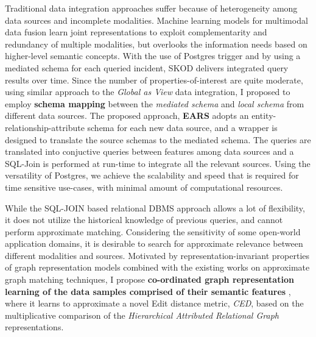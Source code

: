 
Traditional data integration approaches suffer because of heterogeneity among data sources and incomplete modalities. Machine learning models for multimodal data fusion learn joint representations to exploit complementarity and redundancy of multiple modalities, but overlooks the information needs based on higher-level semantic concepts. With the use of Postgres trigger and by using a mediated schema for each queried incident, SKOD delivers integrated query results over time. Since the number of properties-of-interest are quite moderate, using similar approach to the \textit{Global as View} data integration, I proposed to employ \textbf{schema mapping} between the \textit{mediated schema} and \textit{local schema} from different data sources. The proposed approach, \textbf{EARS} \cite{solaiman2021applying} adopts an entity-relationship-attribute schema for each new data source, and a wrapper is designed to translate the source schemas to the mediated schema. The queries are translated into conjuctive queries between features among data sources and a SQL-Join is performed at run-time to integrate all the relevant sources. Using the versatility of Postgres, we achieve the scalability and speed that is required for time sensitive use-cases, with minimal amount of computational resources. 

While the SQL-JOIN based relational DBMS approach allows a lot of flexibility, it does not utilize the historical knowledge of previous queries,
and cannot perform approximate matching. Considering the sensitivity of some open-world application domains, it is desirable to search for approximate relevance between different modalities and sources. 
Motivated by
representation-invariant properties of graph representation models
combined with the existing works on approximate graph matching techniques, 
I propose \textbf{co-ordinated graph representation learning of the data samples comprised of their semantic features} \cite{solaiman2022femmir}, where it learns to approximate a novel Edit distance metric, \textit{CED}, based on the multiplicative comparison of the \textit{Hierarchical Attributed Relational Graph} representations. 
